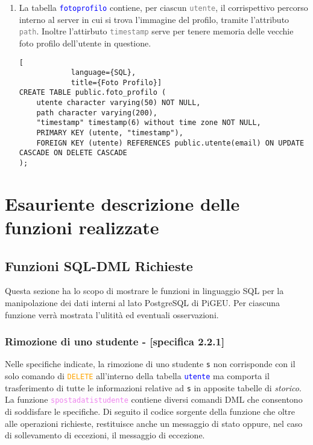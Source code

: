 \documentclass{article}
\newcommand{\tabb}[1]{\texttt{\textcolor{blue}{#1}}}
\newcommand{\attr}[1]{\texttt{\textcolor{gray}{#1}}}
\newcommand{\sqlcommand}[1]{\texttt{\textcolor{orange}{#1}}}
\newcommand{\sqlfunc}[1]{\texttt{\textcolor{violet}{#1}}}
\newcommand{\und}[0]{\textunderscore}
\begin{document}
\begin{enumerate}
        \item La tabella \tabb{foto\und profilo} contiene, per ciascun \attr{utente}, il corrispettivo percorso interno al server in cui si trova l'immagine del profilo, tramite l'attributo \attr{path}. Inoltre l'attirbuto \attr{timestamp} serve per tenere memoria delle vecchie foto profilo dell'utente in questione.
        \begin{lstlisting}[
            language={SQL},
            title={Foto Profilo}]
CREATE TABLE public.foto_profilo (
    utente character varying(50) NOT NULL,
    path character varying(200),
    "timestamp" timestamp(6) without time zone NOT NULL,
    PRIMARY KEY (utente, "timestamp"),
    FOREIGN KEY (utente) REFERENCES public.utente(email) ON UPDATE CASCADE ON DELETE CASCADE
);
        \end{lstlisting}
    \end{enumerate}

    \section{Esauriente descrizione delle funzioni realizzate}
    \subsection{Funzioni SQL-DML Richieste}
    Questa sezione ha lo scopo di mostrare le funzioni in linguaggio SQL per la manipolazione dei dati interni al lato PostgreSQL di PiGEU. Per ciascuna funzione verrà mostrata l'ulitità ed eventuali osservazioni.
    \subsubsection{Rimozione di uno studente - [specifica 2.2.1]}
    Nelle specifiche indicate, la rimozione di uno studente \texttt{s} non corrisponde con il solo comando di \sqlcommand{DELETE} all'interno della tabella \tabb{utente} ma comporta il trasferimento di tutte le informazioni relative ad \texttt{s} in apposite tabelle di \textit{storico}. La funzione \sqlfunc{sposta\und dati\und studente} contiene diversi comandi DML che consentono di soddisfare le specifiche. Di seguito il codice sorgente della funzione che oltre alle operazioni richieste, restituisce anche un messaggio di stato oppure, nel caso di sollevamento di eccezioni, il messaggio di eccezione.
\end{document}
